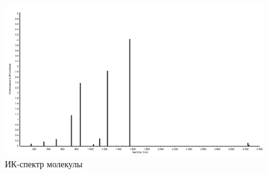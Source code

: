 \begin{figure}[H]
    \centering
    \captionsetup{justification=centering}
    \includegraphics[scale=0.4]{fig/1}
    \caption{ИК-спектр молекулы}
\end{figure}